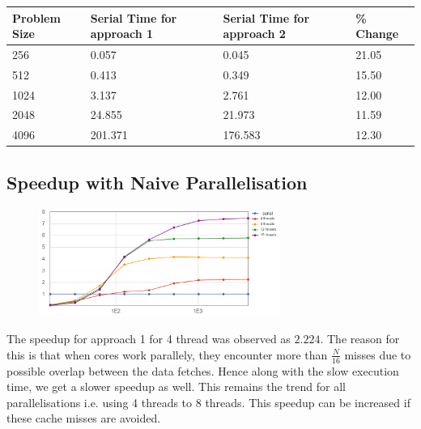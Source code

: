 \documentclass{article}
\begin{document}

\begin{table}[!h]
\centering
\begin{tabular}{|l|l|l|l|} \hline
Problem Size & Serial Time for approach 1 &Serial Time for approach 2 & \% Change \\ \hline

256       & 0.057               & 0.045                  & 21.05    \\
512       & 0.413               & 0.349                  & 15.50    \\
1024       & 3.137               & 2.761                  & 12.00    \\
2048      & 24.855               & 21.973                 & 11.59    \\
4096        & 201.371               & 176.583                  & 12.30    \\
\hline
\end{tabular}
\end{table}


\subsection{Speedup with Naive Parallelisation}
\begin{figure} %
    \centering
    \includegraphics[width=0.7\textwidth]{app1_speedup.png}
\end{figure}
The speedup for approach 1 for 4 thread was observed as $2.224$. The reason for this is that when cores work parallely, they encounter more than $\frac{N}{16}$ misses due to possible overlap between the data fetches. Hence along with the slow execution time, we get a slower speedup as well. This remains the trend for all parallelisations i.e. using 4 threads to 8 threads. This speedup can be increased if these cache misses are avoided.
\\ \\ 
\end{document}
